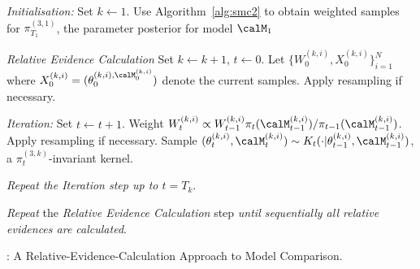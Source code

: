\begin{algorithm}
\begin{algorithmic}
  \tophrule
  \STATE \emph{Initialisation:} Set $k\leftarrow1$.
  \STATE\STATESKIP Use Algorithm~\ref{alg:smc2} to obtain weighted samples
  for $\pi_{T_1}^{(3,1)}$, the parameter posterior for model $\calM_1$

  \STATE \emph{Relative Evidence Calculation}
  \STATE\STATESKIP Set $k\leftarrow k + 1$, $t\leftarrow0$.
  \STATE\STATESKIP Let
  $\{W_0^{(k,i)},X_0^{(k,i)}\}_{i=1}^N$ where $X_0^{(k,i)} =
  (\theta_0^{(k,i),\calM_0^{(k,i)}})$ denote the current samples.
  \STATE\STATESKIP Apply resampling if necessary.

  \STATE\STATESKIP \emph{Iteration:} Set $t\leftarrow t + 1$.
  \STATE\STATESKIP\STATESKIP Weight $W_t^{(k,i)} \propto W_{t-1}^{(k,i)}
  {\pi_t(\calM_{t-1}^{(k,i)})}/{\pi_{t-1}(\calM_{t-1}^{(k,i)})}$.
  \STATE\STATESKIP\STATESKIP Apply resampling if necessary.
  \STATE\STATESKIP\STATESKIP Sample $(\theta_t^{(k,i)},\calM_t^{(k,i)}) \sim
  K_t(\cdot|\theta_{t-1}^{(k,i)},\calM_{t-1}^{(k,i)})$, a
  $\pi_t^{(3,k)}$-invariant kernel.

  \STATE\STATESKIP \emph{Repeat the \emph{Iteration} step up to $t = T_k$}.

  \STATE \emph{Repeat} the \emph{Relative Evidence Calculation} step \emph{until
    sequentially all relative evidences are calculated}.
  \bottomhrule
\end{algorithmic}
\caption{\smc[3]: A Relative-Evidence-Calculation Approach to Model Comparison.}
\label{alg:smc3}
\end{algorithm}
